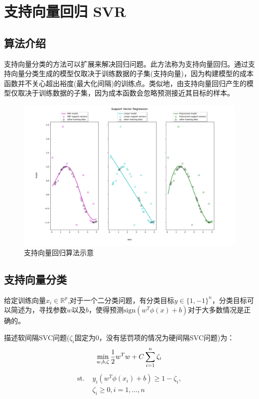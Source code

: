 \documentclass{ctexart}
\begin{document}
\section{支持向量回归 SVR}
\subsection{算法介绍}
支持向量分类的方法可以扩展来解决回归问题。此方法称为支持向量回归。通过支持向量分类生成的模型仅取决于训练数据的子集(支持向量)，因为构建模型的成本函数并不关心超出裕度(最大化间隔)的训练点。类似地，由支持向量回归产生的模型仅取决于训练数据的子集，因为成本函数会忽略预测接近其目标的样本。
\begin{figure}[H]
	\includegraphics[width=1\textwidth]{../images/svr0.png}
	\caption{支持向量回归算法示意}
\end{figure}
\subsection{支持向量分类}
给定训练向量$x_i \in \mathbb{R}^p$,对于一个二分类问题，有分类目标$y \in \{1, -1\}^n$，分类目标可以简述为，寻找参数$w$以及$b$，使得预测$\text{sign} (w^T\phi(x) + b)$对于大多数情况是正确的。


描述软间隔SVC问题($\zeta_i$固定为0，没有惩罚项的情况为硬间隔SVC问题)为：
\begin{equation}
\min_ {w, b, \zeta} \frac{1}{2} w^T w + C \sum_{i=1}^{n} \zeta_i\\
\end{equation}
\begin{equation}
	\begin{split}\textrm {st.  \ \ \  } & y_i (w^T \phi (x_i) + b) \geq 1 - \zeta_i,\\
	& \zeta_i \geq 0, i=1, ..., n\end{split}
\end{equation}
\end{document}
